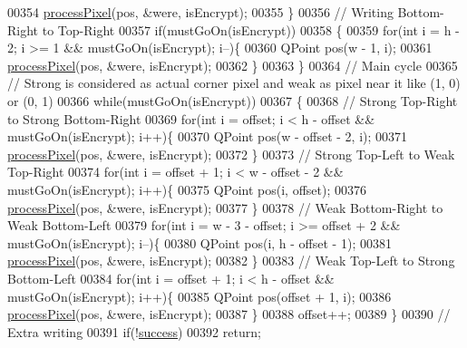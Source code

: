 \begin{DoxyCode}
00354         \hyperlink{class_model_p_c_a1171f9fe1550133dc9053a46b4e5bcfd}{processPixel}(pos, &were, isEncrypt);
00355     \}
00356     \textcolor{comment}{// Writing Bottom-Right to Top-Right}
00357     \textcolor{keywordflow}{if}(mustGoOn(isEncrypt))
00358     \{
00359         \textcolor{keywordflow}{for}(\textcolor{keywordtype}{int} i = h - 2; i >= 1 && mustGoOn(isEncrypt); i--)\{
00360             QPoint pos(w - 1, i);
00361             \hyperlink{class_model_p_c_a1171f9fe1550133dc9053a46b4e5bcfd}{processPixel}(pos, &were, isEncrypt);
00362         \}
00363     \}
00364     \textcolor{comment}{// Main cycle}
00365     \textcolor{comment}{// Strong is considered as actual corner pixel and weak as pixel near it like (1, 0) or (0, 1)}
00366     \textcolor{keywordflow}{while}(mustGoOn(isEncrypt))
00367     \{
00368         \textcolor{comment}{// Strong Top-Right to Strong Bottom-Right}
00369         \textcolor{keywordflow}{for}(\textcolor{keywordtype}{int} i = offset; i < h - offset && mustGoOn(isEncrypt); i++)\{
00370             QPoint pos(w - offset - 2, i);
00371             \hyperlink{class_model_p_c_a1171f9fe1550133dc9053a46b4e5bcfd}{processPixel}(pos, &were, isEncrypt);
00372         \}
00373         \textcolor{comment}{// Strong Top-Left to Weak Top-Right}
00374         \textcolor{keywordflow}{for}(\textcolor{keywordtype}{int} i = offset + 1; i < w - offset - 2 && mustGoOn(isEncrypt); i++)\{
00375             QPoint pos(i, offset);
00376             \hyperlink{class_model_p_c_a1171f9fe1550133dc9053a46b4e5bcfd}{processPixel}(pos, &were, isEncrypt);
00377         \}
00378         \textcolor{comment}{// Weak Bottom-Right to Weak Bottom-Left}
00379         \textcolor{keywordflow}{for}(\textcolor{keywordtype}{int} i = w - 3 - offset; i >= offset + 2 && mustGoOn(isEncrypt); i--)\{
00380             QPoint pos(i, h - offset - 1);
00381             \hyperlink{class_model_p_c_a1171f9fe1550133dc9053a46b4e5bcfd}{processPixel}(pos, &were, isEncrypt);
00382         \}
00383         \textcolor{comment}{// Weak Top-Left to Strong Bottom-Left}
00384         \textcolor{keywordflow}{for}(\textcolor{keywordtype}{int} i = offset + 1; i < h - offset && mustGoOn(isEncrypt); i++)\{
00385             QPoint pos(offset + 1, i);
00386             \hyperlink{class_model_p_c_a1171f9fe1550133dc9053a46b4e5bcfd}{processPixel}(pos, &were, isEncrypt);
00387         \}
00388         offset++;
00389     \}
00390     \textcolor{comment}{// Extra writing}
00391     \textcolor{keywordflow}{if}(!\hyperlink{class_model_p_c_a945ffbbc44a832b953c191debd448f4c}{success})
00392         \textcolor{keywordflow}{return};

\end{DoxyCode}
